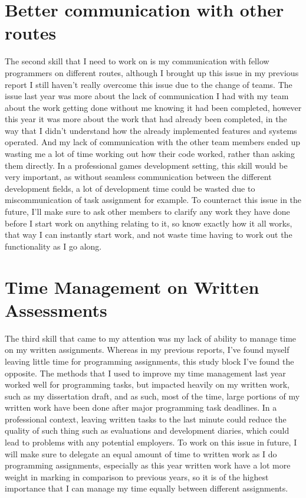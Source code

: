 \documentclass{scrartcl}
\begin{document}
\section{Better communication with other routes}
The second skill that I need to work on is my communication with fellow programmers on different routes, although I brought up this issue in my previous report I still haven't really overcome this issue due to the change of teams. The issue last year was more about the lack of communication I had with my team about the work getting done without me knowing it had been completed, however this year it was more about the work that had already been completed, in the way that I didn't understand how the already implemented features and systems operated. And my lack of communication with the other team members ended up wasting me a lot of time working out how their code worked, rather than asking them directly. In a professional games development setting, this skill would be very important, as without seamless communication between the different development fields, a lot of development time could be wasted due to miscommunication of task assignment for example. To counteract this issue in the future, I'll make sure to ask other members to clarify any work they have done before I start work on  anything relating to it, so know exactly how it all works, that way I can instantly start work, and not waste time having to work out the functionality as I go along. 


\section{Time Management on Written Assessments}
The third skill that came to my attention was my lack of ability to manage time on my written assignments. Whereas in my previous reports, I've found myself leaving little time for programming assignments, this study block I've found the opposite. The methods that I used to improve my time management last year worked well for programming tasks, but impacted heavily on my written work, such as my dissertation draft, and as such, most of the time, large portions of my written work have been done after major programming task deadlines. In a professional context, leaving written tasks to the last minute could reduce the quality of such thing such as evaluations and development diaries, which could lead to problems with any potential employers. To work on this issue in future, I will make sure to delegate an equal amount of time to written work as I do programming assignments, especially as this year written work have a lot more weight in marking in comparison to previous years, so it is of the highest importance that I can manage my time equally between different assignments. 
\end{document}
